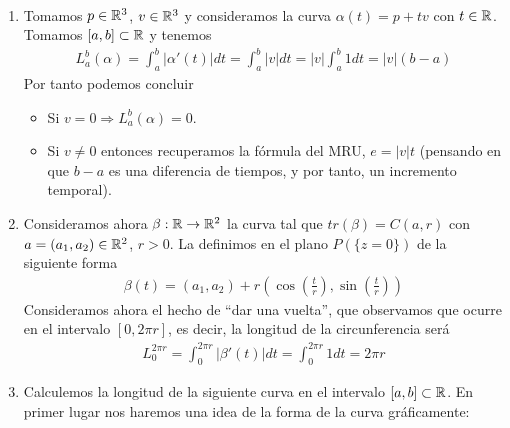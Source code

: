 \begin{ejemplo}\
    \begin{enumerate}
        \item Tomamos $p\in \mathbb{R}^3$, $v\in \mathbb{R}^3$ y consideramos la curva $\alpha(t) = p +tv$ con $t\in \mathbb{R}$. Tomamos $[a,b]\subset \mathbb{R}$ y tenemos
        \begin{gather*}
            L_a^b(\alpha) = \int_a^b |\alpha'(t)| dt = \int_a^b |v| dt = |v| \int_a^b 1 dt = |v|(b-a)
        \end{gather*}
        Por tanto podemos concluir
        \begin{itemize}
            \item Si $v=0 \Rightarrow L_a^b(\alpha) = 0$.
            \item Si $v\neq 0$ entonces recuperamos la fórmula del MRU, $e = |v| t$ (pensando en que $b-a$ es una diferencia de tiempos, y por tanto, un incremento temporal).
        \end{itemize}

        \item Consideramos ahora $\beta : \mathbb{R} \to \mathbb{R}^2$ la curva tal que $tr(\beta) = C(a,r)$ con $a=(a_1, a_2)\in \mathbb{R}^2$, $r>0$. La definimos en el plano $P(\{z=0\})$ de la siguiente forma
        \begin{gather*}
            \beta(t) = (a_1,a_2) + r\left(\cos\left(\frac{t}{r}\right), \sin\left(\frac{t}{r}\right)\right)
        \end{gather*}
        Consideramos ahora el hecho de ``dar una vuelta'', que observamos que ocurre en el intervalo $[0, 2\pi r]$, es decir, la longitud de la circunferencia será
        \begin{gather*}
            L_0^{2\pi r} = \int_0^{2\pi r} |\beta'(t)| dt = \int_0^{2\pi r} 1 dt = 2\pi r
        \end{gather*}

        \item Calculemos la longitud de la siguiente curva
        en el intervalo $[a,b]\subset \mathbb{R}$. En primer lugar nos haremos una idea de la forma de la curva gráficamente:


\end{enumerate}
\end{ejemplo}
